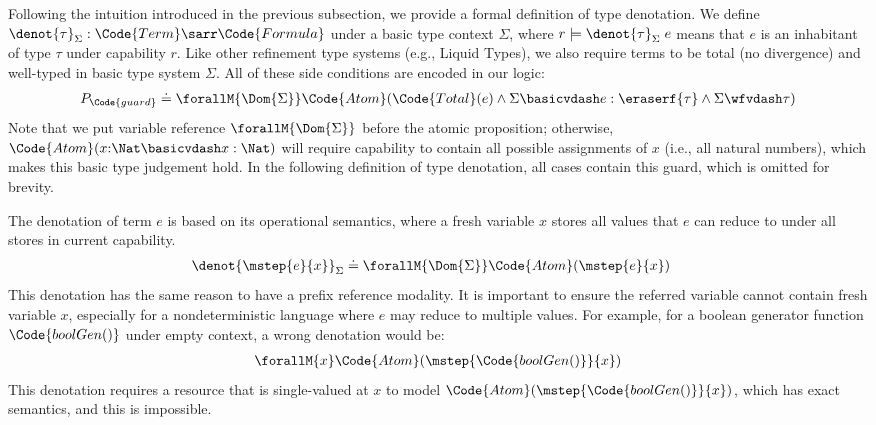 \begin{definition}
Following the intuition introduced in the previous subsection, we provide a formal definition of type denotation. We define $\denot{\tau}_\Sigma: \Code{Term} \sarr \Code{Formula}$ under a basic type context $\Sigma$, where $r \models \denot{\tau}_\Sigma\;e$ means that $e$ is an inhabitant of type $\tau$ under capability $r$. Like other refinement type systems (e.g., Liquid Types), we also require terms to be total (no divergence) and well-typed in basic type system $\Sigma$. All of these side conditions are encoded in our logic:
\begin{align*}
  P_{\Code{guard}} \doteq \forallM{\Dom{\Sigma}} \Code{Atom}(\Code{Total}(e) \land \Sigma \basicvdash e : \eraserf{\tau} \land \Sigma \wfvdash \tau)
\end{align*}\noindent
Note that we put variable reference $\forallM{\Dom{\Sigma}}$ before the atomic proposition; otherwise, $\Code{Atom}(x{:}\Nat \basicvdash x : \Nat)$ will require capability to contain all possible assignments of $x$ (i.e., all natural numbers), which makes this basic type judgement hold. In the following definition of type denotation, all cases contain this guard, which is omitted for brevity.

\begin{definition} The denotation of term $e$ is based on its operational semantics, where a fresh variable $x$ stores all values that $e$ can reduce to under all stores in current capability.
  \begin{align*}
    \denot{\mstep{e}{x}}_\Sigma &\doteq \forallM{\Dom{\Sigma}} \Code{Atom}(\mstep{e}{x})
  \end{align*}\noindent
This denotation has the same reason to have a prefix reference modality. It is important to ensure the referred variable cannot contain fresh variable $x$, especially for a nondeterministic language where $e$ may reduce to multiple values. For example, for a boolean generator function $\Code{boolGen()}$ under empty context, a wrong denotation would be:
\begin{align*}
  \forallM{x} \Code{Atom}(\mstep{\Code{boolGen()}}{x})
\end{align*}\noindent
This denotation requires a resource that is single-valued at $x$ to model $\Code{Atom}(\mstep{\Code{boolGen()}}{x})$, which has exact semantics, and this is impossible.
\end{definition}


\end{definition}
